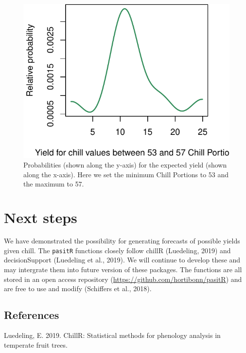 \documentclass[]{article}
\begin{document}
\begin{figure}
\centering
\includegraphics{Abstract_SHE_Chill_Yield_Model_files/figure-latex/chillkernelslicerange-1.pdf}
\caption{\label{fig:chillkernelslicerange}Probabilities (shown along the
y-axis) for the expected yield (shown along the x-axis). Here we set the
minimum Chill Portions to 53 and the maximum to 57.}
\end{figure}

\hypertarget{next-steps}{%
\section{Next steps}\label{next-steps}}

We have demonstrated the possibility for generating forecasts of
possible yields given chill. The \texttt{pasitR} functions closely
follow chillR (Luedeling, 2019) and decisionSupport (Luedeling et al.,
2019). We will continue to develop these and may intergrate them into
future version of these packages. The functions are all stored in an
open access repository (\url{https://github.com/hortibonn/pasitR}) and
are free to use and modify (Schiffers et al., 2018).

\hypertarget{references}{%
\subsection*{References}\label{references}}

\hypertarget{refs}{}
\leavevmode\hypertarget{ref-R-chillR}{}%
Luedeling, E. 2019. ChillR: Statistical methods for phenology analysis
in temperate fruit trees.
\end{document}
